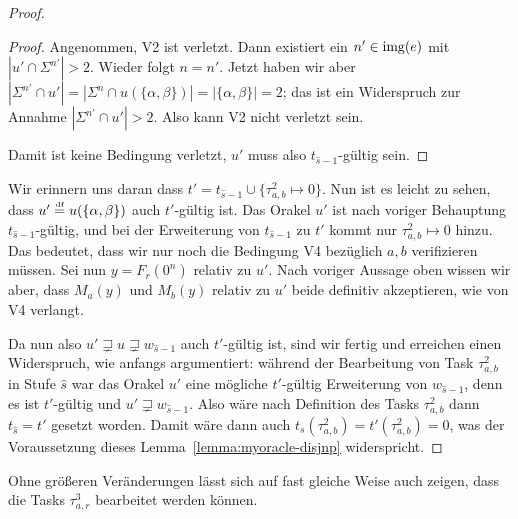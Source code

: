 \begin{proof}
\begin{proof}
    Angenommen, V2 ist verletzt. Dann existiert ein $n'\in\operatorname{img}(e)$ mit $|u'\cap\Sigma^{n'}|>2$.
    Wieder folgt $n=n'$.
    Jetzt haben wir aber $|\Sigma^{n'}\cap u'|=|\Sigma^n\cap u(\{\alpha, \beta\})| = |\{\alpha,\beta\}|=2$; das ist ein Widerspruch zur Annahme $|\Sigma^{n'}\cap u'|>2$. Also kann V2 nicht verletzt sein. 

    Damit ist keine Bedingung verletzt, $u'$ muss also $t_{\hat{s}-1}$-gültig sein.
\end{proof}
Wir erinnern uns daran dass $t'=t_{\hat{s}-1}\cup \{\tau^2_{a,b}\mapsto 0\}$.
Nun ist es leicht zu sehen, dass $u'\stackrel{\text{{\normalfont\tiny df}}}{=} u(\{\alpha,\beta\})$ auch $t'$-gültig ist. Das Orakel $u'$ ist nach voriger Behauptung $t_{\hat{s}-1}$-gültig, und bei der Erweiterung von $t_{\hat{s}-1}$ zu $t'$ kommt nur $\tau^2_{a,b}\mapsto 0$ hinzu. Das bedeutet, dass wir nur noch die Bedingung V4 bezüglich $a,b$ verifizieren müssen.
Sei nun $y=F_r(0^n)$ relativ zu $u'$.
Nach voriger Aussage oben wissen wir aber, dass $M_a(y)$ und $M_b(y)$ relativ zu $u'$ beide definitiv akzeptieren, wie von V4 verlangt.

Da nun also $u'\sqsupsetneq u \sqsupsetneq w_{\hat{s}-1}$ auch $t'$-gültig ist, sind wir fertig und erreichen einen Widerspruch, wie anfangs argumentiert: während der Bearbeitung von Task $\tau^2_{a,b}$ in Stufe $\hat{s}$ war das Orakel $u'$ eine mögliche $t'$-gültig Erweiterung von $w_{\hat{s}-1}$, denn es ist $t'$-gültig und $u'\sqsupsetneq w_{\hat{s}-1}$. Also wäre nach Definition des Tasks $\tau^2_{a,b}$ dann $t_{\hat{s}}=t'$ gesetzt worden.
Damit wäre dann auch $t_{s}(\tau^2_{a,b})=t'(\tau^2_{a,b})=0$, was der Voraussetzung dieses Lemma~\ref{lemma:myoracle-disjnp} widerspricht.
\end{proof}

Ohne größeren Veränderungen lässt sich auf fast gleiche Weise auch zeigen, dass die Tasks $\tau^3_{a,r}$ bearbeitet werden können.

